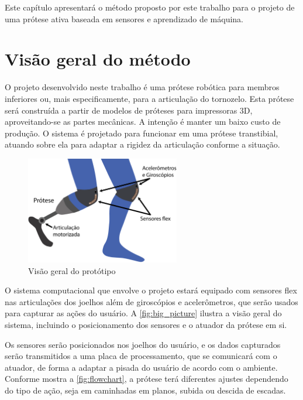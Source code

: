 Este capítulo apresentará o método proposto por este trabalho para o projeto de uma prótese ativa baseada em sensores e aprendizado de máquina.

\section{Visão geral do método}
\label{sec:metodo_protese}

O projeto desenvolvido neste trabalho é uma prótese robótica para membros inferiores ou, mais especificamente, para a articulação do tornozelo. Esta prótese será construída a partir de modelos de próteses para impressoras 3D, aproveitando-se as partes mecânicas. A intenção é manter um baixo custo de produção. O sistema é projetado para funcionar em uma prótese transtibial, atuando sobre ela para adaptar a rigidez da articulação conforme a situação.

\begin{figure}[h]
	\caption{\label{fig:big_picture}Visão geral do protótipo}
	\begin{center}
	    \includegraphics[width=0.6\textwidth]{resources/big_picture}
	\end{center}
\end{figure}

O sistema computacional que envolve o projeto estará equipado com sensores flex nas articulações dos joelhos além de giroscópios e acelerômetros, que serão usados para capturar as ações do usuário. A \autoref{fig:big_picture} ilustra a visão geral do sistema, incluindo o posicionamento dos sensores e o atuador da prótese em si.

Os sensores serão posicionados nos joelhos do usuário, e os dados capturados serão transmitidos a uma placa de processamento, que se comunicará com o atuador, de forma a adaptar a pisada do usuário de acordo com o ambiente. Conforme mostra a \autoref{fig:flowchart}, a prótese terá diferentes ajustes dependendo do tipo de ação, seja em caminhadas em planos, subida ou descida de escadas.

